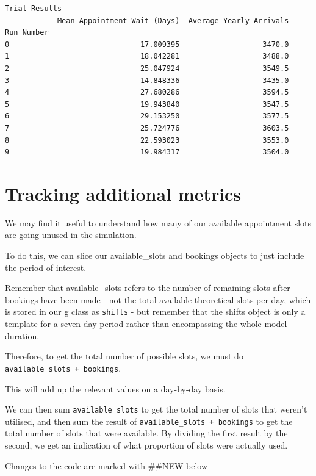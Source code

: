 \documentclass[
  letterpaper,
  DIV=11,
  numbers=noendperiod]{scrreprt}
\begin{document}
\begin{verbatim}
Trial Results
            Mean Appointment Wait (Days)  Average Yearly Arrivals
Run Number                                                       
0                              17.009395                   3470.0
1                              18.042281                   3488.0
2                              25.047924                   3549.5
3                              14.848336                   3435.0
4                              27.680286                   3594.5
5                              19.943840                   3547.5
6                              29.153250                   3577.5
7                              25.724776                   3603.5
8                              22.593023                   3553.0
9                              19.984317                   3504.0
\end{verbatim}

\section{Tracking additional metrics}\label{tracking-additional-metrics}

We may find it useful to understand how many of our available
appointment slots are going unused in the simulation.

To do this, we can slice our available\_slots and bookings objects to
just include the period of interest.

Remember that available\_slots refers to the number of remaining slots
after bookings have been made - not the total available theoretical
slots per day, which is stored in our g class as \texttt{shifts} - but
remember that the shifts object is only a template for a seven day
period rather than encompassing the whole model duration.

Therefore, to get the total number of possible slots, we must do
\texttt{available\_slots\ +\ bookings}.

This will add up the relevant values on a day-by-day basis.

We can then sum \texttt{available\_slots} to get the total number of
slots that weren't utilised, and then sum the result of
\texttt{available\_slots\ +\ bookings} to get the total number of slots
that were available. By dividing the first result by the second, we get
an indication of what proportion of slots were actually used.

\begin{tcolorbox}[enhanced jigsaw, colframe=quarto-callout-note-color-frame, bottomtitle=1mm, breakable, rightrule=.15mm, coltitle=black, colbacktitle=quarto-callout-note-color!10!white, opacityback=0, leftrule=.75mm, arc=.35mm, toptitle=1mm, title=\textcolor{quarto-callout-note-color}{\faInfo}\hspace{0.5em}{Note}, titlerule=0mm, colback=white, toprule=.15mm, bottomrule=.15mm, left=2mm, opacitybacktitle=0.6]

Changes to the code are marked with \#\#NEW below

\end{tcolorbox}
\end{document}
